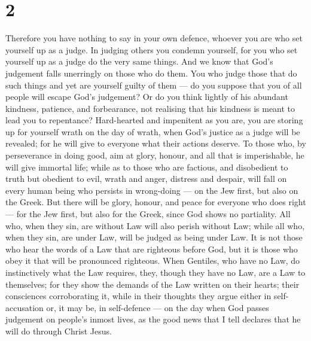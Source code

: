 \hypertarget{section-1}{%
\section{2}\label{section-1}}

 Therefore you have nothing to say in your own defence,
whoever you are who set yourself up as a judge. In judging others you
condemn yourself, for you who set yourself up as a judge do the very
same things.  And we know that God's judgement falls
unerringly on those who do them.  You who judge those that
do such things and yet are yourself guilty of them --- do you suppose
that you of all people will escape God's judgement?  Or do
you think lightly of his abundant kindness, patience, and forbearance,
not realising that his kindness is meant to lead you to repentance?
 Hard-hearted and impenitent as you are, you are storing up
for yourself wrath on the day of wrath, when God's justice as a judge
will be revealed;  for he will give to everyone what their
actions deserve.  To those who, by perseverance in doing
good, aim at glory, honour, and all that is imperishable, he will give
immortal life;  while as to those who are factious, and
disobedient to truth but obedient to evil, wrath and anger, distress and
despair,  will fall on every human being who persists in
wrong-doing --- on the Jew first, but also on the Greek. 
But there will be glory, honour, and peace for everyone who does right
--- for the Jew first, but also for the Greek,  since God
shows no partiality.  All who, when they sin, are without
Law will also perish without Law; while all who, when they sin, are
under Law, will be judged as being under Law.  It is not
those who hear the words of a Law that are righteous before God, but it
is those who obey it that will be pronounced righteous. 
When Gentiles, who have no Law, do instinctively what the Law requires,
they, though they have no Law, are a Law to themselves; 
for they show the demands of the Law written on their hearts; their
consciences corroborating it, while in their thoughts they argue either
in self-accusation or, it may be, in self-defence ---  on
the day when God passes judgement on people's inmost lives, as the good
news that I tell declares that he will do through Christ Jesus.

